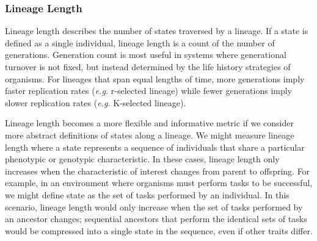 \documentclass[letterpaper]{article}
\begin{document}
\subsubsection{Lineage Length}
Lineage length describes the number of states traversed by a lineage. If a state is defined as a single individual, %
lineage length is a count of the number of generations.
Generation count is most useful in systems where generational turnover is not fixed, %
but instead determined by the life history strategies of organisms.
For lineages that span equal lengths of time, more generations imply faster replication rates (\textit{e.g.} r-selected lineage) while fewer generations imply slower replication rates (\textit{e.g.} K-selected lineage). 

Lineage length becomes %
a more flexible and informative metric if we consider more abstract definitions of %
states along a lineage. 
We might measure lineage length where a state represents a %
sequence of individuals that share a particular phenotypic or genotypic characteristic.
In these cases, lineage length only increases when the characteristic of interest changes from parent to offspring. For example, in an environment where organisms must perform tasks to be successful, we might define state as the set of tasks performed by an individual. %
In this scenario, lineage length would only increase when the set of tasks performed by an ancestor changes; sequential ancestors that perform the identical sets of tasks would be compressed into a single state in the sequence, even if other traits differ. 
\end{document}
